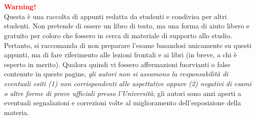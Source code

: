 \chapter*{}

\vspace*{0.3\paperheight}
\begin{center}
    \textcolor{red}{\textbf{Warning!}}\\
    Questa è una raccolta di appunti redatta da studenti e
    condivisa per altri studenti. Non pretende di essere un libro
    di testo, ma una forma di aiuto libero e gratuito per coloro
    che fossero in cerca di materiale di supporto allo studio.
    Pertanto, si raccomanda di non preparare l'esame basandosi unicamente
    su questi appunti, ma di fare riferimento alle lezioni frontali
    e ai libri (in breve, a chi è esperto in merito). Qualora quindi
    vi fossero affermazioni fuorvianti o false contenute in queste
    pagine, \textit{gli autori non si assumono la responsabilità di eventuali
    esiti (1) non corrispondenti alle aspettative oppure (2) negativi di esami
    o altre forme di prove ufficiali presso l'Università}; gli autori sono anzi
    aperti a eventuali segnalazioni e correzioni volte al miglioramento
    dell'esposizione della materia.
\end{center}